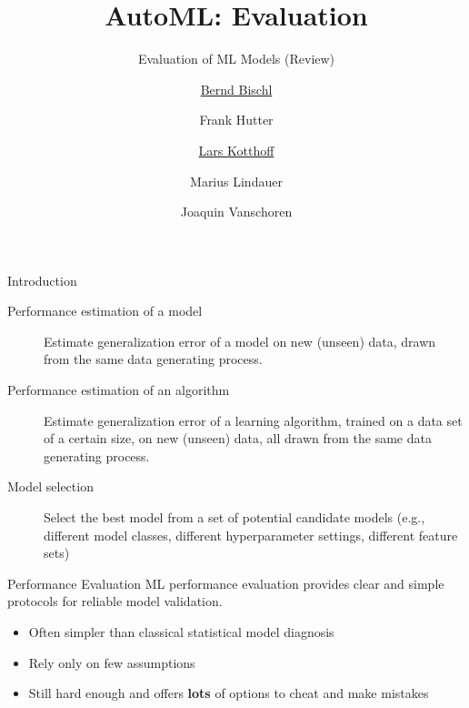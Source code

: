 




\title[AutoML: Risks]{AutoML: Evaluation} %
\subtitle{Evaluation of ML Models (Review)} %
\author[Lars Kotthoff]{\underline{Bernd Bischl} \and Frank Hutter \and \underline{Lars Kotthoff}\newline \and Marius Lindauer \and Joaquin Vanschoren}
\institute{}
\date{}

\newcommand\reffootnote[1]{%
    \begingroup
    \renewcommand\thefootnote{}\footnote{
        \tiny #1
    \vspace*{1em}}%
    \addtocounter{footnote}{-1}%
    \endgroup
}



	
	\maketitle

    \begin{frame}[c]{Introduction}
    \begin{description}
    \item[Performance estimation of a model]
        Estimate generalization error of a model on new (unseen) data, drawn from the same data generating process.
    \item[Performance estimation of an algorithm]
        Estimate generalization error of a learning algorithm, trained on a data set
        of a certain size, on new (unseen) data, all drawn from the same data generating process.
    \item[Model selection]
        Select the best model from a set of potential candidate models (e.g., different model classes, different
        hyperparameter settings, different feature sets)
    \end{description}
    \end{frame}

    \begin{frame}[c]{Performance Evaluation}
    ML performance evaluation provides clear and simple protocols for reliable model
    validation. 

    \begin{itemize}
    \item Often simpler than classical statistical model diagnosis
    \item Rely only on few assumptions
    \item Still hard enough and offers \textbf{lots} of options to cheat and make mistakes
    \end{itemize}
    \end{frame}

